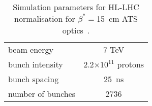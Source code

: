 \begin{table}%
   \centering
   \caption{Simulation parameters for HL-LHC normalisation for $\beta^* =$15~cm ATS optics~\cite{ATSref}.}
   \begin{tabular}{l|c}
       \hline
       beam energy & 7 TeV \\
       bunch intensity & 2.2$\times 10^{11}$ protons\\
       bunch spacing & 25~ns \\
       number of bunches & 2736 \\
       \hline
   \end{tabular}
   \label{hlscenario}
\end{table}
